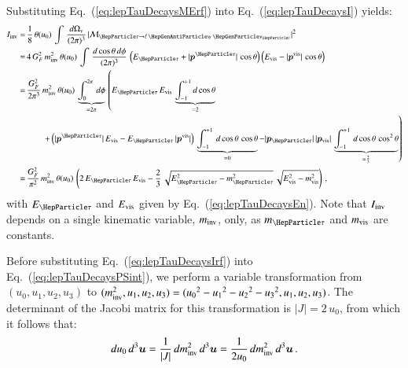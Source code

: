 Substituting Eq.~(\ref{eq:lepTauDecaysMErf}) into Eq.~(\ref{eq:lepTauDecaysI}) yields:
\begin{align}
I_{\inv} 
= & \, \frac{1}{8} \, \theta ( u_{0} ) \, \int \, \frac{d\Omega_{v}}{(2\pi)^{3}} \, \vert\mathcal{M}_{\Pgt \to
  \ellnunu}\vert^{2} \nonumber \\
= & \, 4 \, G^{2}_{F} \, m^{2}_{\inv} \, \theta ( u_{0} ) \, \int \, \frac{d\cos\theta \, d\phi}{(2\pi)^{3}} \, 
  \left( E_{\Pgt} + \vert\bm{p}^{\Pgt}\vert \, \cos\theta \right)  \left( E_{\vis} - \vert\bm{p}^{\vis}\vert \, \cos\theta \right) \nonumber \\
= & \, \frac{G^{2}_{F}}{2 \pi^{3}} \, m^{2}_{\inv} \, \theta ( u_{0} ) \, \underbrace{\int_{0}^{2 \pi} \, d\phi}_{= 2 \pi} \, 
  \left( E_{\Pgt} \, E_{\vis} \, \underbrace{\int_{-1}^{+1}
      d\cos\theta}_{= 2} \right. \nonumber \\
& \qquad
     \left. + \left( \vert\bm{p}^{\Pgt}\vert \, E_{\vis} - E_{\Pgt} \,
       \vert\bm{p}^{\vis}\vert \right) \,
     \underbrace{\int_{-1}^{+1} \, d\cos\theta \, \cos\theta}_{= 0} 
  - \vert\bm{p}_{\Pgt}\vert \, \vert\bm{p}_{\vis}\vert
       \, \underbrace{\int_{-1}^{+1} \, d\cos\theta \, \cos^{2}\theta}_{= \frac{2}{3}} \right) \nonumber \\
= & \, \frac{G^{2}_{F}}{\pi^{2}} \, m^{2}_{\inv} \, \theta ( u_{0} ) \, 
  \left( 2 \, E_{\Pgt} \, E_{\vis} - \frac{2}{3} \, \sqrt{E^{2}_{\Pgt} - m^{2}_{\Pgt}} \, \sqrt{E^{2}_{\vis} - m^{2}_{\vis}} \right) \, ,
\label{eq:lepTauDecaysIrf}
\end{align}
with $E_{\Pgt}$ and $E_{\textrm{vis}}$ given by Eq.~(\ref{eq:lepTauDecaysEn}).
Note that $I
_{\textrm{inv}}$ depends on a single kinematic variable, $m_{\textrm{inv}}$, only,
as $m_{\Pgt}$ and $m_{\textrm{vis}}$ are constants.

Before substituting Eq.~(\ref{eq:lepTauDecaysIrf}) into Eq.~(\ref{eq:lepTauDecaysPSint}),
we perform a variable transformation from $( u_{0}, u_{1}, u_{2}, u_{3} )$ to $( m^{2}_{\textrm{inv}}, u_{1}, u_{2}, u_{3} ) = ( {u_{0}}^{2} - {u_{1}}^{2} - {u_{2}}^{2} - {u_{3}}^{2}, u_{1}, u_{2}, u_{3} )$.
The determinant of the Jacobi matrix for this transformation is $\vert J
\vert = 2 \, u_{0}$,
from which it follows that:
\begin{equation}
du_{0} \, d^{3}\bm{u} = \frac{1}{\vert J \vert} \, dm^{2}_{\textrm{inv}} \,
d^{3}\bm{u} = \frac{1}{2 u_{0}} \, dm^{2}_{\textrm{inv}} \, d^{3}\bm{u} \, .
\label{eq:lepTauDecaysJacobi}
\end{equation}

